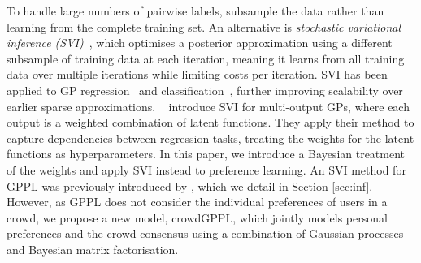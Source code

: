 To handle large numbers of pairwise labels, \citet{khan2014scalable}
subsample the data rather than learning from the complete training set.
An alternative is \emph{stochastic variational inference (SVI)}~\citep{hoffman2013stochastic}, 
which optimises a posterior approximation using 
a different subsample of training data at each iteration, meaning it learns from
all training data over multiple iterations while limiting costs per iteration.
SVI has been applied to GP regression~\citep{hensman2013gaussian} and classification~\citep{hensman2015scalable},
further improving scalability over earlier sparse approximations.
~\citet{nguyen2014collaborative} introduce SVI for multi-output GPs,
where each output is a weighted combination of latent functions.
They apply their method to capture dependencies between regression tasks,
treating the weights for the latent functions as hyperparameters. 
In this paper, we 
introduce a Bayesian treatment of the weights %
and apply SVI instead to preference learning.
An SVI method for GPPL
was previously introduced by \citet{simpson2018finding},
which we detail in Section \ref{sec:inf}.
However, as GPPL does not consider the individual preferences of users in a crowd,
 we propose a new model, crowdGPPL, which
jointly models personal preferences and the crowd consensus
using a combination of Gaussian processes and Bayesian matrix factorisation.
